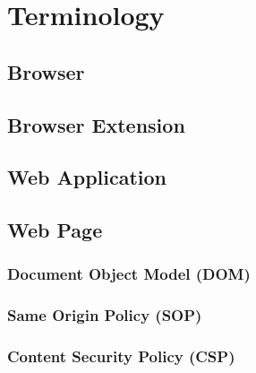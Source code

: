 
\section{Terminology}

\subsection{Browser}

\subsection{Browser Extension}

\subsection{Web Application}

\subsection{Web Page}

\subsubsection{Document Object Model (DOM)}

\subsubsection{Same Origin Policy (SOP)}

\subsubsection{Content Security Policy (CSP)}

